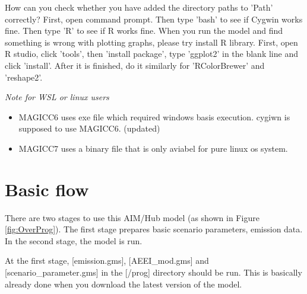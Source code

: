 \documentclass[10pt,a4paper,titlepage,dvipdfmx]{book}
\begin{document}
How can you check whether you have added the directory paths to 'Path' correctly? First, open command prompt. Then type 'bash' to see if Cygwin works fine. Then type 'R' to see if R works fine.
When you run the model and find something is wrong with plotting graphs, please try install R library. First, open R studio, click 'tools', then 'install package', type 'ggplot2' in the blank line and click 'install'. After it is finished, do it similarly for 'RColorBrewer' and 'reshape2'.

\emph{Note for WSL or linux users}
\begin{itemize}
\item MAGICC6 uses exe file which required windows basis execution. cygiwn is supposed to use MAGICC6.  
(updated)
\item MAGICC7 uses a binary file that is only aviabel for pure linux os system.
\end{itemize}



\section{ \label{ref-0065}Basic flow\label{mark-6.2.}}

There are two stages to use this AIM/Hub model (as shown in Figure \ref{fig:OverProg}). The first stage prepares basic scenario parameters, emission data. In the second stage, the model is run. 

At the first stage, [emission.gms], [AEEI\_mod.gms] and [scenario\_parameter.gms] in the [/prog] directory should be run. This is basically already done when you download the latest version of the model.
\end{document}

